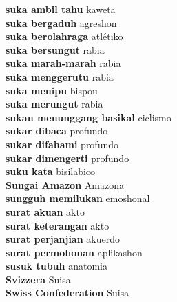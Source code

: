 \textbf{ suka ambil tahu  } kaweta \\
\textbf{ suka bergaduh  } agreshon \\
\textbf{ suka berolahraga  } atlétiko \\
\textbf{ suka bersungut  } rabia \\
\textbf{ suka marah-marah  } rabia \\
\textbf{ suka menggerutu  } rabia \\
\textbf{ suka menipu  } bispou \\
\textbf{ suka merungut  } rabia \\
\textbf{ sukan menunggang basikal  } ciclismo \\
\textbf{ sukar dibaca  } profundo \\
\textbf{ sukar difahami  } profundo \\
\textbf{ sukar dimengerti  } profundo \\
\textbf{ suku kata  } bisilabico \\
\textbf{ Sungai Amazon  } Amazona \\
\textbf{ sungguh memilukan  } emoshonal \\
\textbf{ surat akuan  } akto \\
\textbf{ surat keterangan  } akto \\
\textbf{ surat perjanjian  } akuerdo \\
\textbf{ surat permohonan  } aplikashon \\
\textbf{ susuk tubuh  } anatomia \\
\textbf{ Svizzera  } Suisa \\
\textbf{ Swiss Confederation  } Suisa \\
